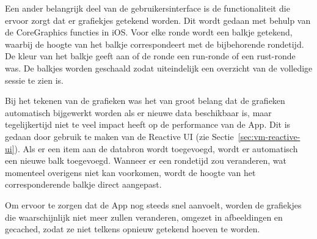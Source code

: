 Een ander belangrijk deel van de gebruikersinterface is de functionaliteit die ervoor zorgt dat er grafiekjes getekend worden. Dit wordt gedaan met behulp van de CoreGraphics functies in iOS. Voor elke ronde wordt een balkje getekend, waarbij de hoogte van het balkje correspondeert met de bijbehorende rondetijd. De kleur van het balkje geeft aan of de ronde een run-ronde of een rust-ronde was. De balkjes worden geschaald zodat uiteindelijk een overzicht van de volledige sessie te zien is.

Bij het tekenen van de grafieken was het van groot belang dat de grafieken automatisch bijgewerkt worden als er nieuwe data beschikbaar is, maar tegelijkertijd niet te veel impact heeft op de performance van de App. Dit is gedaan door gebruik te maken van de Reactive UI (zie Sectie~\ref{sec:vm-reactive-ui}). Als er een item aan de databron wordt toegevoegd, wordt er automatisch een nieuwe balk toegevoegd. Wanneer er een rondetijd zou veranderen, wat momenteel overigens niet kan voorkomen, wordt de hoogte van het corresponderende balkje direct aangepast.

Om ervoor te zorgen dat de App nog steeds snel aanvoelt, worden de grafiekjes die waarschijnlijk niet meer zullen veranderen, omgezet in afbeeldingen en gecached, zodat ze niet telkens opnieuw getekend hoeven te worden.